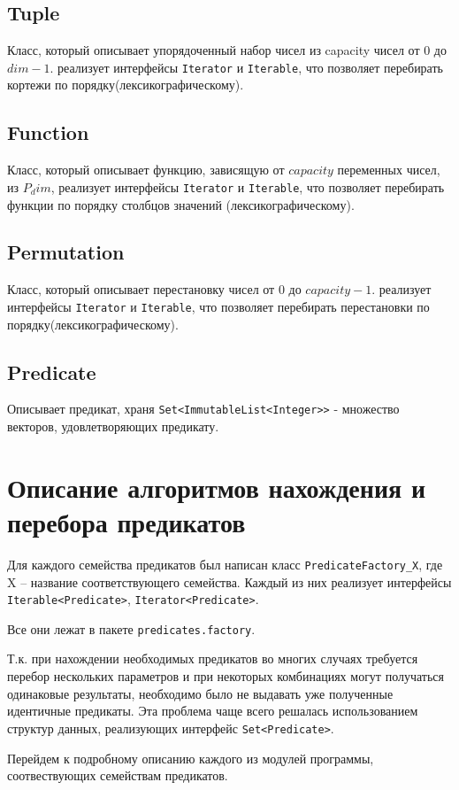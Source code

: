 \documentclass[a4paper,14pt]{extreport}
\begin{document}
\subsection{Tuple}
Класс, который описывает упорядоченный набор чисел из capacity чисел от $0$ до $dim-1$. реализует интерфейсы {\tt Iterator} и {\tt Iterable}, что позволяет перебирать кортежи по порядку(лексикографическому).
\subsection{Function}
Класс, который описывает функцию, зависящую от $capacity$ переменных чисел, из $P_dim$, реализует интерфейсы {\tt Iterator} и {\tt Iterable}, что позволяет перебирать функции по порядку столбцов значений (лексикографическому).
\subsection{Permutation}
Класс, который описывает перестановку чисел от $0$ до $capacity-1$. реализует интерфейсы {\tt Iterator} и {\tt Iterable}, что позволяет перебирать перестановки по порядку(лексикографическому).
\subsection{Predicate} 
Описывает предикат, храня {\tt Set<ImmutableList<Integer>>} - множество векторов, удовлетворяющих предикату.

\section{Описание алгоритмов нахождения и перебора предикатов}
Для каждого семейства предикатов был написан класс {\tt PredicateFactory\_X}, где X – название соответствующего семейства. Каждый из них реализует интерфейсы {\tt Iterable<Predicate>}, {\tt Iterator<Predicate>}.

Все они лежат в пакете {\tt predicates.factory}.

Т.к. при нахождении необходимых предикатов во многих случаях требуется перебор нескольких параметров и при некоторых комбинациях могут получаться  одинаковые результаты, необходимо было не выдавать уже полученные идентичные предикаты. Эта  проблема чаще всего решалась использованием структур данных, реализующих интерфейс {\tt Set<Predicate>}. 

Перейдем к подробному описанию каждого из модулей программы, соотвествующих семействам предикатов.
\end{document}
